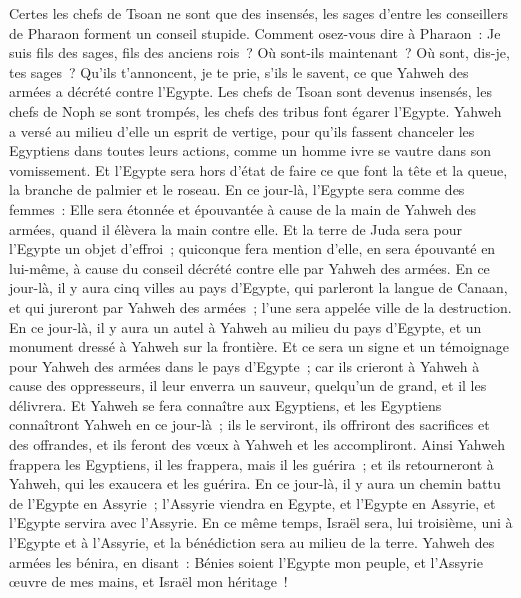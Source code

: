 \begin{multicols}{2}
Certes les chefs de Tsoan ne sont que des insensés, les sages d'entre les conseillers de Pharaon forment un conseil stupide. Comment osez-vous dire à Pharaon~: Je suis fils des sages, fils des anciens rois~?
Où sont-ils maintenant~? Où sont, dis-je, tes sages~? Qu'ils t'annoncent, je te prie, s'ils le savent, ce que Yahweh des armées a décrété contre l'Egypte.
Les chefs de Tsoan sont devenus insensés, les chefs de Noph se sont trompés, les chefs des tribus font égarer l'Egypte.
Yahweh a versé au milieu d'elle un esprit de vertige, pour qu'ils fassent chanceler les Egyptiens dans toutes leurs actions, comme un homme ivre se vautre dans son vomissement.
Et l'Egypte sera hors d'état de faire ce que font la tête et la queue, la branche de palmier et le roseau.
En ce jour-là, l'Egypte sera comme des femmes~: Elle sera étonnée et épouvantée à cause de la main de Yahweh des armées, quand il élèvera la main contre elle.
Et la terre de Juda sera pour l'Egypte un objet d'effroi~; quiconque fera mention d'elle, en sera épouvanté en lui-même, à cause du conseil décrété contre elle par Yahweh des armées.
En ce jour-là, il y aura cinq villes au pays d'Egypte, qui parleront la langue de Canaan, et qui jureront par Yahweh des armées~; l'une sera appelée ville de la destruction.
En ce jour-là, il y aura un autel à Yahweh au milieu du pays d'Egypte, et un monument dressé à Yahweh sur la frontière.
Et ce sera un signe et un témoignage pour Yahweh des armées dans le pays d'Egypte~; car ils crieront à Yahweh à cause des oppresseurs, il leur enverra un sauveur, quelqu'un de grand, et il les délivrera.
Et Yahweh se fera connaître aux Egyptiens, et les Egyptiens connaîtront Yahweh en ce jour-là~; ils le serviront, ils offriront des sacrifices et des offrandes, et ils feront des vœux à Yahweh et les accompliront.
Ainsi Yahweh frappera les Egyptiens, il les frappera, mais il les guérira~; et ils retourneront à Yahweh, qui les exaucera et les guérira.
En ce jour-là, il y aura un chemin battu de l'Egypte en Assyrie~; l'Assyrie viendra en Egypte, et l'Egypte en Assyrie, et l'Egypte servira avec l'Assyrie.
En ce même temps, Israël sera, lui troisième, uni à l'Egypte et à l'Assyrie, et la bénédiction sera au milieu de la terre.
Yahweh des armées les bénira, en disant~: Bénies soient l'Egypte mon peuple, et l'Assyrie œuvre de mes mains, et Israël mon héritage~!

\end{multicols}
